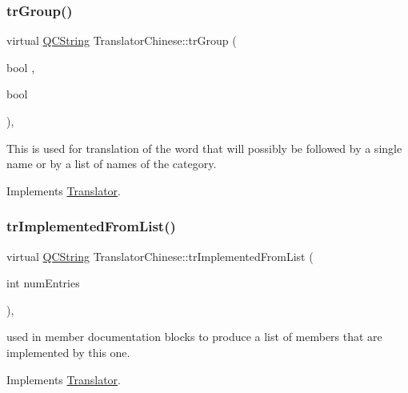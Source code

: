 \mbox{\label{class_translator_chinese_a245f51a8f8ea56eb5a8802e5ce25760e}} 
\subsubsection{\texorpdfstring{trGroup()}{trGroup()}}
{\footnotesize\ttfamily virtual \mbox{\hyperlink{class_q_c_string}{Q\+C\+String}} Translator\+Chinese\+::tr\+Group (\begin{DoxyParamCaption}\item[{bool}]{,  }\item[{bool}]{ }\end{DoxyParamCaption})\hspace{0.3cm}{\ttfamily [inline]}, {\ttfamily [virtual]}}

This is used for translation of the word that will possibly be followed by a single name or by a list of names of the category. 

Implements \mbox{\hyperlink{class_translator}{Translator}}.

\mbox{\label{class_translator_chinese_a84df422ab63903672e55d008055bc7d0}} 
\subsubsection{\texorpdfstring{trImplementedFromList()}{trImplementedFromList()}}
{\footnotesize\ttfamily virtual \mbox{\hyperlink{class_q_c_string}{Q\+C\+String}} Translator\+Chinese\+::tr\+Implemented\+From\+List (\begin{DoxyParamCaption}\item[{int}]{num\+Entries }\end{DoxyParamCaption})\hspace{0.3cm}{\ttfamily [inline]}, {\ttfamily [virtual]}}

used in member documentation blocks to produce a list of members that are implemented by this one. 

Implements \mbox{\hyperlink{class_translator}{Translator}}.

\mbox{\label{class_translator_chinese_a19566de80486f3f2cd62b33bd7f27d86}} 
